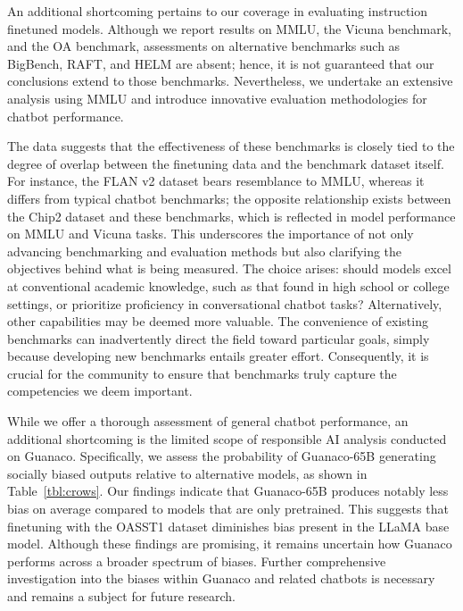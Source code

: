An additional shortcoming pertains to our coverage in evaluating instruction finetuned models. Although we report results on MMLU, the Vicuna benchmark, and the OA benchmark, assessments on alternative benchmarks such as BigBench, RAFT, and HELM are absent; hence, it is not guaranteed that our conclusions extend to those benchmarks. Nevertheless, we undertake an extensive analysis using MMLU and introduce innovative evaluation methodologies for chatbot performance.

The data suggests that the effectiveness of these benchmarks is closely tied to the degree of overlap between the finetuning data and the benchmark dataset itself. For instance, the FLAN v2 dataset bears resemblance to MMLU, whereas it differs from typical chatbot benchmarks; the opposite relationship exists between the Chip2 dataset and these benchmarks, which is reflected in model performance on MMLU and Vicuna tasks. This underscores the importance of not only advancing benchmarking and evaluation methods but also clarifying the objectives behind what is being measured. The choice arises: should models excel at conventional academic knowledge, such as that found in high school or college settings, or prioritize proficiency in conversational chatbot tasks? Alternatively, other capabilities may be deemed more valuable. The convenience of existing benchmarks can inadvertently direct the field toward particular goals, simply because developing new benchmarks entails greater effort. Consequently, it is crucial for the community to ensure that benchmarks truly capture the competencies we deem important.

While we offer a thorough assessment of general chatbot performance, an additional shortcoming is the limited scope of responsible AI analysis conducted on {Guanaco}. Specifically, we assess the probability of {Guanaco}-65B generating socially biased outputs relative to alternative models, as shown in Table~\ref{tbl:crows}. Our findings indicate that {Guanaco}-65B produces notably less bias on average compared to models that are only pretrained. This suggests that finetuning with the OASST1 dataset diminishes bias present in the LLaMA base model. Although these findings are promising, it remains uncertain how {Guanaco} performs across a broader spectrum of biases. Further comprehensive investigation into the biases within {Guanaco} and related chatbots is necessary and remains a subject for future research.

